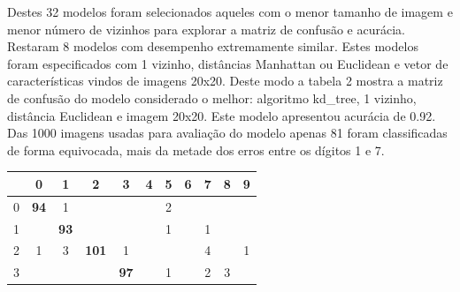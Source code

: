 \documentclass[
	12pt,				%
	openright,			%
	twoside,			%
	a4paper,			%
	english,			%
	brazil,				%
	svgnames
	]{abntex2}\usepackage[]{graphicx}\usepackage[]{color}
\begin{document}
Destes 32 modelos foram selecionados aqueles com o menor tamanho de imagem e menor número de vizinhos para explorar a matriz de confusão e acurácia. Restaram 8 modelos com desempenho extremamente similar. Estes modelos foram especificados com 1 vizinho, distâncias Manhattan ou Euclidean e vetor de características vindos de imagens 20x20. Deste modo a tabela 2 mostra a matriz de confusão do modelo considerado o melhor: algoritmo kd\_tree, 1 vizinho, distância Euclidean e imagem 20x20. Este modelo apresentou acurácia de 0.92. Das 1000 imagens usadas para avaliação do modelo apenas 81 foram classificadas de forma equivocada, mais da metade dos erros entre os dígitos 1 e 7.

\begin{table}[h]
\centering
\begin{tabular}{c|cccccccccc}
\cline{2-11}
  & 0                                & 1                                & 2                                 & 3                                & 4                                & 5                                & 6                                & 7                                & 8                                & 9                                 \\ \hline
0 & \multicolumn{1}{c|}{\textbf{94}} & 1                                &                                   &                                  &                                  & 2                                &                                  &                                  &                                  &                                   \\ \cline{2-3}
1 & \multicolumn{1}{c|}{}            & \multicolumn{1}{c|}{\textbf{93}} &                                   &                                  &                                  & 1                                &                                  & 1                                &                                  &                                   \\ \cline{3-4}
2 & 1                                & \multicolumn{1}{c|}{3}           & \multicolumn{1}{c|}{\textbf{101}} & 1                                &                                  &                                  &                                  & 4                                &                                  & 1                                 \\ \cline{4-5}
3 &                                  &                                  & \multicolumn{1}{c|}{}             & \multicolumn{1}{c|}{\textbf{97}} &                                  & 1                                &                                  & 2                                & 3                                &                                   \\ \cline{5-6}

\end{tabular}
\end{table}
\end{document}

